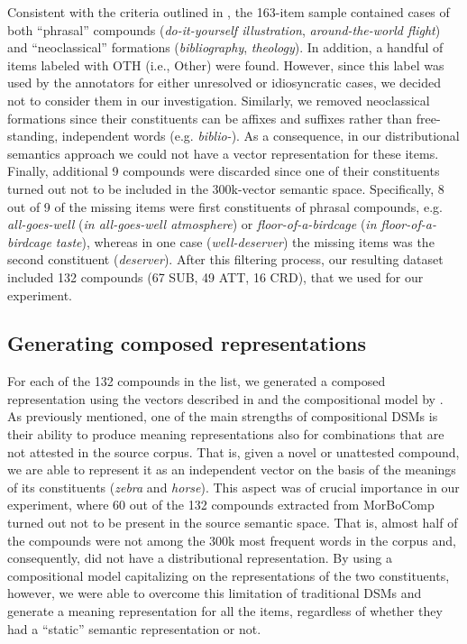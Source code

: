 \documentclass[output=paper]{langsci/langscibook}
\begin{document}
Consistent with the criteria outlined in \cite{SB2005}, the 163-item sample contained cases of both ``phrasal'' compounds (\emph{do-it-yourself illustration}, \emph{around-the-world flight}) and ``neoclassical'' formations (\emph{bibliography}, \emph{theology}). In addition, a handful of items labeled with OTH (i.e., Other) were found. However, since this label was used by the annotators for either unresolved or idiosyncratic cases, we decided not to consider them in our investigation. Similarly, we removed neoclassical formations since their constituents can be affixes and suffixes rather than free-standing, independent words (e.g. \emph{biblio-}). As a consequence, in our distributional semantics approach we could not have a vector representation for these items. Finally, additional 9 compounds were discarded since one of their constituents turned out not to be included in the 300k-vector semantic space. Specifically, 8 out of 9 of the missing items were first constituents of phrasal compounds, e.g. \emph{all-goes-well} (\emph{in all-goes-well atmosphere}) or \emph{floor-of-a-birdcage} (\emph{in floor-of-a-birdcage taste}), whereas in one case (\emph{well-deserver}) the missing items was the second constituent (\emph{deserver}). After this filtering process, our resulting dataset included 132 compounds (67 SUB, 49 ATT, 16 CRD), that we used for our experiment.


\subsection{Generating composed representations}


For each of the 132 compounds in the list, we generated a composed representation using the vectors described in  and the compositional model by \cite{guevara2010}. As previously mentioned, one of the main strengths of compositional DSMs is their ability to produce meaning representations also for combinations that are not attested in the source corpus. That is, given a novel or unattested compound, we are able to represent it as an independent vector on the basis of the meanings of its constituents (\emph{zebra} and \emph{horse}). This aspect was of crucial importance in our experiment, where 60 out of the 132 compounds extracted from MorBoComp turned out not to be present in the source semantic space. That is, almost half of the compounds were not among the 300k most frequent words in the corpus and, consequently, did not have a distributional representation. By using a compositional model capitalizing on the representations of the two constituents, however, we were able to overcome this limitation of traditional DSMs and generate a meaning representation for all the items, regardless of whether they had a ``static'' semantic representation or not.
\end{document}
